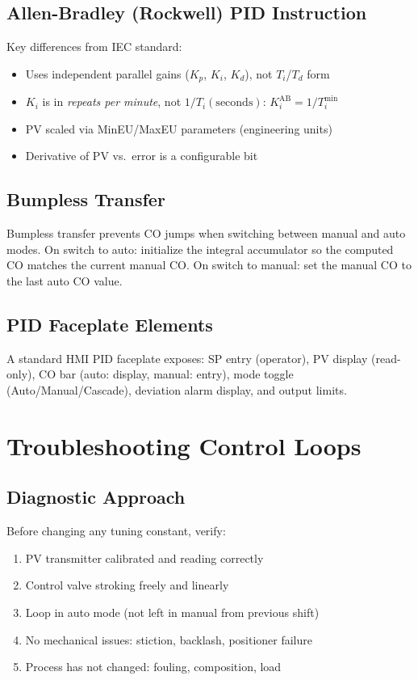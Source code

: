 \documentclass[12pt,twoside,openright]{memoir}
\begin{document}
\section{Allen-Bradley (Rockwell) PID Instruction}

Key differences from IEC standard:
\begin{itemize}
  \item Uses independent parallel gains ($K_p$, $K_i$, $K_d$), not $T_i$/$T_d$ form
  \item $K_i$ is in \emph{repeats per minute}, not $1/T_i(\text{seconds})$: $K_i^\text{AB} = 1/T_i^\text{min}$
  \item PV scaled via MinEU/MaxEU parameters (engineering units)
  \item Derivative of PV vs.\ error is a configurable bit
\end{itemize}

\section{Bumpless Transfer}

Bumpless transfer prevents CO jumps when switching between manual and auto modes. On switch to auto: initialize the integral accumulator so the computed CO matches the current manual CO. On switch to manual: set the manual CO to the last auto CO value.

\section{PID Faceplate Elements}

A standard HMI PID faceplate exposes: SP entry (operator), PV display (read-only), CO bar (auto: display, manual: entry), mode toggle (Auto/Manual/Cascade), deviation alarm display, and output limits.

\chapter{Troubleshooting Control Loops}

\section{Diagnostic Approach}

Before changing any tuning constant, verify:
\begin{enumerate}
  \item PV transmitter calibrated and reading correctly
  \item Control valve stroking freely and linearly
  \item Loop in auto mode (not left in manual from previous shift)
  \item No mechanical issues: stiction, backlash, positioner failure
  \item Process has not changed: fouling, composition, load
\end{enumerate}
\end{document}
